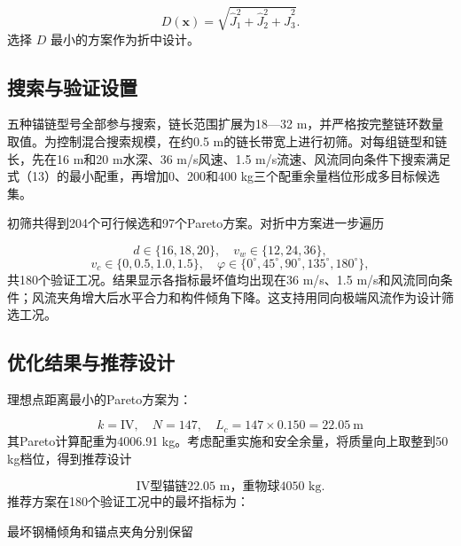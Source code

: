 \[
D(\boldsymbol x)=
\sqrt{\hat J_1^2+\hat J_2^2+\hat J_3^2}. \tag{15}
\]
选择 \(D\) 最小的方案作为折中设计。

\subsection{搜索与验证设置}
五种锚链型号全部参与搜索，链长范围扩展为18—32 m，并严格按完整链环数量取值。为控制混合搜索规模，在约0.5 m的链长带宽上进行初筛。对每组链型和链长，先在16 m和20 m水深、36 m/s风速、1.5 m/s流速、风流同向条件下搜索满足式（13）的最小配重，再增加0、200和400 kg三个配重余量档位形成多目标候选集。

初筛共得到204个可行候选和97个Pareto方案。对折中方案进一步遍历

\[
d\in\{16,18,20\},
\quad v_w\in\{12,24,36\},
\]
\[
v_c\in\{0,0.5,1.0,1.5\},
\quad\varphi\in\{0^\circ,45^\circ,90^\circ,135^\circ,180^\circ\},
\]
共180个验证工况。结果显示各指标最坏值均出现在36 m/s、1.5 m/s和风流同向条件；风流夹角增大后水平合力和构件倾角下降。这支持用同向极端风流作为设计筛选工况。

\subsection{优化结果与推荐设计}
理想点距离最小的Pareto方案为：

\[
\boxed{
k=\mathrm{IV},\quad N=147,
\quad L_c=147\times0.150=22.05\ \mathrm m
}
\]
其Pareto计算配重为4006.91 kg。考虑配重实施和安全余量，将质量向上取整到50 kg档位，得到推荐设计

\[
\boxed{
\text{IV型锚链22.05 m，重物球4050 kg}
}. \tag{16}
\]
推荐方案在180个验证工况中的最坏指标为：

\begin{table}[H]\centering\small
\caption{推荐方案的鲁棒验证结果}
\label{tab:q3-1}
\end{table}
最坏钢桶倾角和锚点夹角分别保留

